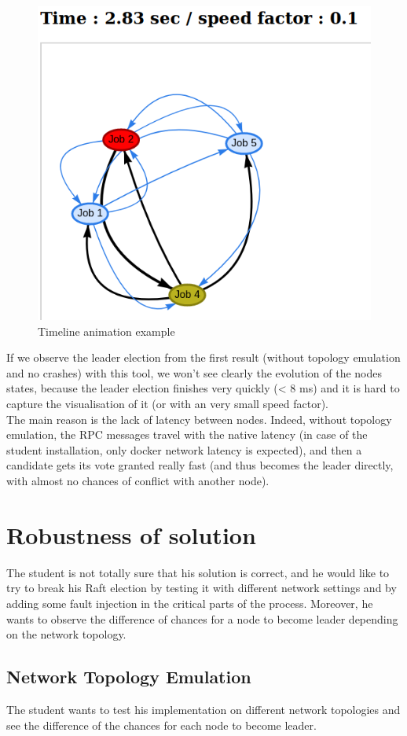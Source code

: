 \documentclass{eplmastersthesis}
\begin{document}
      \begin{figure}[H]
        \centering
        \includegraphics[width=0.4\linewidth]{figures/user_case/anim_pres.png}
        \caption{Timeline animation example}
      \end{figure}

      If we observe the leader election from the first result (without
      topology emulation and no crashes) with this tool, we won't see clearly
      the evolution of the nodes states, because the leader election finishes
      very quickly (< 8 ms) and it is hard to capture the visualisation of it
      (or with an very small speed factor).\\
      The main reason is the lack of latency between nodes. Indeed, without
      topology emulation, the RPC messages travel with the native latency
      (in case of the student installation, only docker network latency is
      expected), and then a candidate gets its vote granted really fast (and
      thus becomes the leader directly, with almost no chances of conflict
      with another node).

    \section{Robustness of solution}

      The student is not totally sure that his solution is correct, and he would
      like to try to break his Raft election by testing it with different
      network settings and by adding some fault injection in the critical
      parts of the process. Moreover, he wants to observe the difference of
      chances for a node to become leader depending on the network topology.

      \subsection{Network Topology Emulation}

        The student wants to test his implementation on different network
        topologies and see the difference of the chances for each node to
        become leader.
\end{document}
